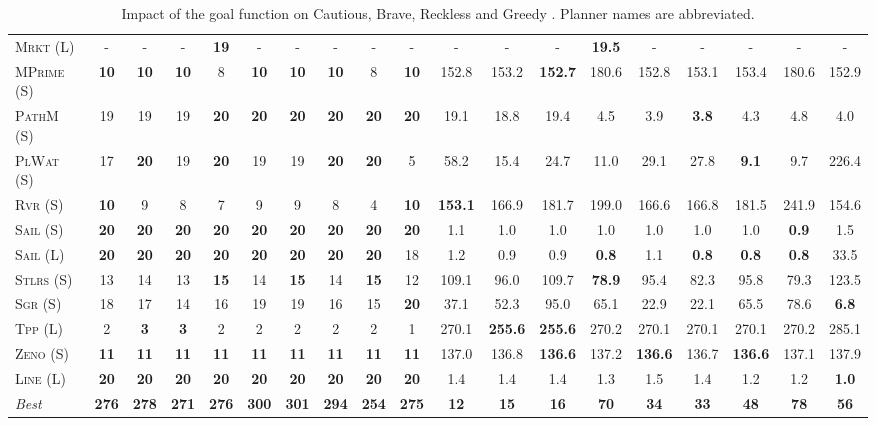 \begin{table}[tb]
{\begin{tabular}{|l||ccccccccc||ccccccccc||}
\textsc{Mrkt} (L)&-&-&-&\textbf{19}&-&-&-&-&-&-&-&-&\textbf{19.5}&-&-&-&-&-\\
\textsc{MPrime} (S)&\textbf{10}&\textbf{10}&\textbf{10}&8&\textbf{10}&\textbf{10}&\textbf{10}&8&\textbf{10}&152.8&153.2&\textbf{152.7}&180.6&152.8&153.1&153.4&180.6&152.9\\
\textsc{PathM} (S)&19&19&19&\textbf{20}&\textbf{20}&\textbf{20}&\textbf{20}&\textbf{20}&\textbf{20}&19.1&18.8&19.4&4.5&3.9&\textbf{3.8}&4.3&4.8&4.0\\
\textsc{PlWat} (S)&17&\textbf{20}&19&\textbf{20}&19&19&\textbf{20}&\textbf{20}&5&58.2&15.4&24.7&11.0&29.1&27.8&\textbf{9.1}&9.7&226.4\\
\textsc{Rvr} (S)&\textbf{10}&9&8&7&9&9&8&4&\textbf{10}&\textbf{153.1}&166.9&181.7&199.0&166.6&166.8&181.5&241.9&154.6\\
\textsc{Sail} (S)&\textbf{20}&\textbf{20}&\textbf{20}&\textbf{20}&\textbf{20}&\textbf{20}&\textbf{20}&\textbf{20}&\textbf{20}&1.1&1.0&1.0&1.0&1.0&1.0&1.0&\textbf{0.9}&1.5\\
\textsc{Sail} (L)&\textbf{20}&\textbf{20}&\textbf{20}&\textbf{20}&\textbf{20}&\textbf{20}&\textbf{20}&\textbf{20}&18&1.2&0.9&0.9&\textbf{0.8}&1.1&\textbf{0.8}&\textbf{0.8}&\textbf{0.8}&33.5\\
\textsc{Stlrs} (S)&13&14&13&\textbf{15}&14&\textbf{15}&14&\textbf{15}&12&109.1&96.0&109.7&\textbf{78.9}&95.4&82.3&95.8&79.3&123.5\\
\textsc{Sgr} (S)&18&17&14&16&19&19&16&15&\textbf{20}&37.1&52.3&95.0&65.1&22.9&22.1&65.5&78.6&\textbf{6.8}\\
\textsc{Tpp} (L)&2&\textbf{3}&\textbf{3}&2&2&2&2&2&1&270.1&\textbf{255.6}&\textbf{255.6}&270.2&270.1&270.1&270.1&270.2&285.1\\
\textsc{Zeno} (S)&\textbf{11}&\textbf{11}&\textbf{11}&\textbf{11}&\textbf{11}&\textbf{11}&\textbf{11}&\textbf{11}&\textbf{11}&137.0&136.8&\textbf{136.6}&137.2&\textbf{136.6}&136.7&\textbf{136.6}&137.1&137.9\\
\textsc{Line} (L)&\textbf{20}&\textbf{20}&\textbf{20}&\textbf{20}&\textbf{20}&\textbf{20}&\textbf{20}&\textbf{20}&\textbf{20}&1.4&1.4&1.4&1.3&1.5&1.4&1.2&1.2&\textbf{1.0}
\\\hline
\textit{Best}&\textbf{276}&\textbf{278}&\textbf{271}&\textbf{276}&\textbf{300}&\textbf{301}&\textbf{294}&\textbf{254}&\textbf{275}&\textbf{12}&\textbf{15}&\textbf{16}&\textbf{70}&\textbf{34}&\textbf{33}&\textbf{48}&\textbf{78}&\textbf{56}\\\hline

        \end{tabular}}
        \caption{Impact of the goal function on Cautious, Brave, Reckless and Greedy \pattyd. Planner names are abbreviated.}
        \label{tab:abl-gf}
        \end{table}
        